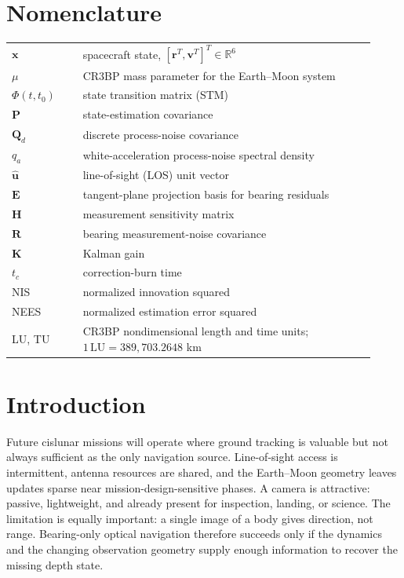 \documentclass[10pt,twocolumn]{article}
\newcommand{\vect}[1]{\mathbf{#1}}
\newcommand{\unit}[1]{\hat{\mathbf{#1}}}
\newcommand{\LU}{\mathrm{LU}}
\begin{document}
\section*{Nomenclature}
\begin{tabular}{@{}p{0.18\linewidth}p{0.74\linewidth}@{}}
$\vect{x}$ & spacecraft state, $[\vect{r}^T,\vect{v}^T]^T\in\mathbb{R}^6$ \\
$\mu$ & CR3BP mass parameter for the Earth--Moon system \\
$\Phi(t,t_0)$ & state transition matrix (STM) \\
$\vect{P}$ & state-estimation covariance \\
$\vect{Q}_d$ & discrete process-noise covariance \\
$q_a$ & white-acceleration process-noise spectral density \\
$\unit{u}$ & line-of-sight (LOS) unit vector \\
$\vect{E}$ & tangent-plane projection basis for bearing residuals \\
$\vect{H}$ & measurement sensitivity matrix \\
$\vect{R}$ & bearing measurement-noise covariance \\
$\vect{K}$ & Kalman gain \\
$t_c$ & correction-burn time \\
NIS & normalized innovation squared \\
NEES & normalized estimation error squared \\
LU, TU & CR3BP nondimensional length and time units; $1\,\LU=389{,}703.2648$ km \\
\end{tabular}

\section{Introduction}
\label{sec:intro}
Future cislunar missions will operate where ground tracking is valuable but not always sufficient as the only navigation source.  Line-of-sight access is intermittent, antenna resources are shared, and the Earth--Moon geometry leaves updates sparse near mission-design-sensitive phases.  A camera is attractive: passive, lightweight, and already present for inspection, landing, or science.  The limitation is equally important: a single image of a body gives direction, not range.  Bearing-only optical navigation therefore succeeds only if the dynamics and the changing observation geometry supply enough information to recover the missing depth state.
\end{document}
